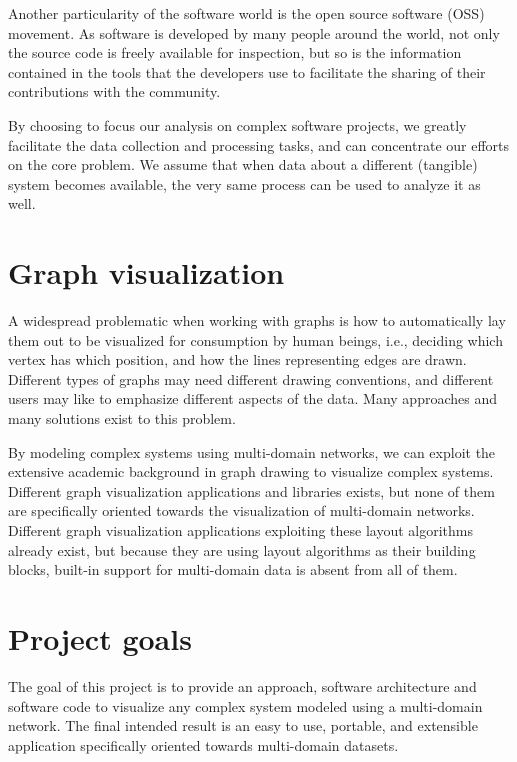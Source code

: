 Another particularity of the software world is the open source software (OSS) movement. As software is developed by many people around the world, not only the source code is freely available for inspection, but so is the information contained in the tools that the developers use to facilitate the sharing of their contributions with the community.

By choosing to focus our analysis on complex software projects, we greatly facilitate the data collection and processing tasks, and can concentrate our efforts on the core problem. We assume that when data about a different (tangible) system becomes available, the very same process can be used to analyze it as well.

\section{Graph visualization}


A widespread problematic when working with graphs is how to automatically lay them out to be visualized for consumption by human beings, i.e., deciding which vertex has which position, and how the lines representing edges are drawn. Different types of graphs may need different drawing conventions, and different users may like to emphasize different aspects of the data. Many approaches and many solutions exist to this problem.

By modeling complex systems using multi-domain networks, we can exploit the extensive academic background in graph drawing to visualize complex systems. Different graph visualization applications and libraries exists, but none of them are specifically oriented towards the visualization of multi-domain networks. Different graph visualization applications exploiting these layout algorithms already exist, but because they are using layout algorithms as their building blocks, built-in support for multi-domain data is absent from all of them.

\section{Project goals}

The goal of this project is to provide an approach, software architecture and software code to visualize any complex system modeled using a multi-domain network. The final intended result is an easy to use, portable, and extensible application specifically oriented towards multi-domain datasets.

